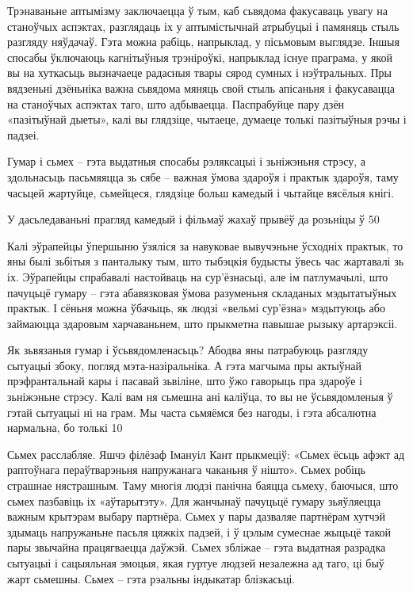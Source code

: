 Трэнаваньне аптымізму заключаецца ў тым, каб сьвядома факусаваць увагу на станоўчых аспэктах, разглядаць іх у аптымістычнай атрыбуцыі і памяняць стыль разгляду няўдачаў. Гэта можна рабіць, напрыклад, у пісьмовым выглядзе. Іншыя спосабы ўключаюць кагнітыўныя трэніроўкі, напрыклад існуе праграма, у якой вы на хуткасьць вызначаеце радасныя твары сярод сумных і нэўтральных. Пры вядзеньні дзёньніка важна сьвядома мяняць свой стыль апісаньня і факусавацца на станоўчых аспэктах таго, што адбываецца. Паспрабуйце пару дзён «пазітыўнай дыеты», калі вы глядзіце, чытаеце, думаеце толькі пазітыўныя рэчы і падзеі.

Гумар і сьмех – гэта выдатныя спосабы рэляксацыі і зьніжэньня стрэсу, а здольнасьць пасьмяяцца зь сябе – важная ўмова здароўя і практык здароўя, таму часьцей жартуйце, сьмейцеся, глядзіце больш камедый і чытайце вясёлыя кнігі. 

У дасьледаваньні прагляд камедый і фільмаў жахаў прывёў да розьніцы ў 50%

Калі эўрапейцы ўпершыню ўзяліся за навуковае вывучэньне ўсходніх практык, то яны былі зьбітыя з панталыку тым, што тыбэцкія будысты ўвесь час жартавалі зь іх. Эўрапейцы спрабавалі настойваць на сур'ёзнасьці, але ім патлумачылі, што пачуцьцё гумару – гэта абавязковая ўмова разуменьня складаных мэдытатыўных практык. І сёньня можна ўбачыць, як людзі «вельмі сур'ёзна» мэдытуюць або займаюцца здаровым харчаваньнем, што прыкметна павышае рызыку артарэксіі. 

Як зьвязаныя гумар і ўсьвядомленасьць? Абодва яны патрабуюць разгляду сытуацыі збоку, погляд мэта-назіральніка. А гэта магчыма пры актыўнай прэфрантальнай кары і пасавай зьвіліне, што ўжо гаворыць пра здароўе і зьніжэньне стрэсу. Калі вам ня сьмешна ані каліўца, то вы не ўсьвядомленыя ў гэтай сытуацыі ні на грам. Мы часта сьмяёмся без нагоды, і гэта абсалютна нармальна, бо толькі 10%

Сьмех расслабляе. Яшчэ філёзаф Імануіл Кант прыкмеціў: «Сьмех ёсьць афэкт ад раптоўнага пераўтварэньня напружанага чаканьня ў нішто». Сьмех робіць страшнае нястрашным. Таму многія людзі панічна баяцца сьмеху, баючыся, што сьмех пазбавіць іх «аўтарытэту». Для жанчынаў пачуцьцё гумару зьяўляецца важным крытэрам выбару партнёра. Сьмех у пары дазваляе партнёрам хутчэй здымаць напружаньне пасьля цяжкіх падзей, і ў цэлым сумеснае жыцьцё такой пары звычайна працягваецца даўжэй. Сьмех збліжае – гэта выдатная разрадка сытуацыі і сацыяльная эмоцыя, якая гуртуе людзей незалежна ад таго, ці быў жарт сьмешны. Сьмех – гэта рэальны індыкатар блізкасьці.

